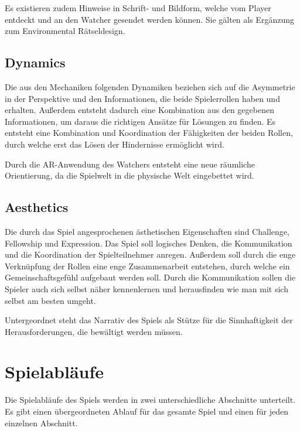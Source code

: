 Es existieren zudem Hinweise in Schrift- und Bildform, welche vom Player entdeckt und an den Watcher gesendet werden können. Sie gälten als Ergänzung zum Environmental Rätseldesign.

\subsection{Dynamics}
Die aus den Mechaniken folgenden Dynamiken beziehen sich auf die Asymmetrie in der Perspektive und den Informationen, die beide Spielerrollen haben und erhalten. Außerdem entsteht dadurch eine Kombination aus den gegebenen Informationen, um daraus die richtigen Ansätze für Lösungen zu finden. 
Es entsteht eine Kombination und Koordination der Fähigkeiten der beiden Rollen, durch welche erst das Lösen der Hindernisse ermöglicht wird.

Durch die AR-Anwendung des Watchers entsteht eine neue räumliche Orientierung, da die Spielwelt in die physische Welt eingebettet wird.


\subsection{Aesthetics}
Die durch das Spiel angesprochenen ästhetischen Eigenschaften sind Challenge, Fellowship und Expression. Das Spiel soll logisches Denken, die Kommunikation und die Koordination der Spielteilnehmer anregen. Außerdem soll durch die enge Verknüpfung der Rollen eine enge Zusammenarbeit entstehen, durch welche ein Gemeinschaftsgefühl aufgebaut werden soll. Durch die Kommunikation sollen die Spieler auch sich selbst näher kennenlernen und herausfinden wie man mit sich selbst am besten umgeht.

Untergeordnet steht das Narrativ des Spiels als Stütze für die Sinnhaftigkeit der Herausforderungen, die bewältigt werden müssen.


\section{Spielabläufe}
Die Spielabläufe des Spiels werden in zwei unterschiedliche Abschnitte unterteilt. Es gibt einen übergeordneten Ablauf für das gesamte Spiel und einen für jeden einzelnen Abschnitt.

